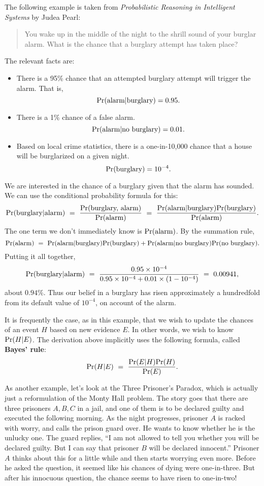The following example is taken from {\it Probabilistic Reasoning in Intelligent Systems} by Judea Pearl:
\begin{quote}
You wake up in the middle of the night to the shrill sound of your burglar alarm. What is the chance that a burglary attempt has taken place?
\end{quote}
The relevant facts are:
\begin{itemize}
\item There is a 95\% chance that an attempted burglary attempt will trigger the alarm. That is,
$$ \mbox{\rm Pr}(\mbox{alarm} | \mbox{burglary}) = 0.95 .$$
\item There is a 1\% chance of a false alarm.
$$ \mbox{\rm Pr}(\mbox{alarm} | \mbox{no burglary}) = 0.01.$$
\item Based on local crime statistics, there is a one-in-10{,}000 chance that a house will be burglarized on a given night.
$$ \mbox{\rm Pr}(\mbox{burglary}) = 10^{-4}.$$
\end{itemize}
We are interested in the chance of a burglary given that the alarm has sounded. We can use the conditional probability formula for this:
$$ \mbox{\rm Pr}(\mbox{burglary} | \mbox{alarm}) 
\ = \ \frac{\mbox{\rm Pr}(\mbox{burglary, alarm})}{\mbox{\rm Pr}(\mbox{alarm})}
\ = \ \frac{\mbox{\rm Pr}(\mbox{alarm} | \mbox{burglary}) \mbox{\rm Pr}(\mbox{burglary})}{\mbox{\rm Pr}(\mbox{alarm})}
.$$
The one term we don't immediately know is $\mbox{\rm Pr}(\mbox{alarm})$. By the summation rule,
$$ 
\pr(\mbox{alarm}) 
\ = \ 
\pr(\mbox{alarm} | \mbox{burglary}) \pr(\mbox{burglary}) +
\pr(\mbox{alarm} | \mbox{no burglary}) \pr(\mbox{no burglary})
.$$
Putting it all together,
$$ \pr(\mbox{burglary} | \mbox{alarm}) 
\ = \ 
\frac{0.95 \times 10^{-4}}{0.95 \times 10^{-4} + 0.01 \times (1-10^{-4})}
\ = \ 
0.00941,
$$
about $0.94\%$. Thus our belief in a burglary has risen approximately a hundredfold from its default value of $10^{-4}$, on account of the alarm.

It is frequently the case, as in this example, that we wish to update the chances of an event $H$ based on new evidence $E$. In other words, we wish to know $\mbox{\rm Pr}(H | E)$. The derivation above implicitly uses the following formula, called {\bf Bayes' rule}:
$$ \pr(H | E) 
\ = \ 
\frac{\pr(E|H) \pr(H)}{\pr(E)}.
$$  

As another example, let's look at the Three Prisoner's Paradox, which is actually just a reformulation of the Monty Hall problem. The story goes that there are three prisoners $A,B,C$ in a jail, and one of them is to be declared guilty and executed the following morning. As the night progresses, prisoner $A$ is racked with worry, and calls the prison guard over. He wants to know whether he is the unlucky one. The guard replies, ``I am not allowed to tell you whether you will be declared guilty. But I can say that prisoner $B$ will be declared innocent.'' Prisoner $A$ thinks about this for a little while and then starts worrying even more. Before he asked the question, it seemed like his chances of dying were one-in-three. But after his innocuous question, the chance seems to have risen to one-in-two!

